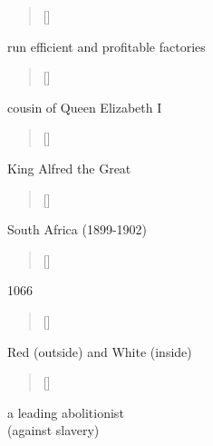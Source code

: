 \documentclass[grid,avery5371]{flashcards}
\begin{document}
\begin{flashcard}[]{%
\begin{verse}[\versewidth]
\end{verse}}

run efficient and profitable factories

\end{flashcard}

\begin{flashcard}[]{%
\begin{verse}[\versewidth]
\end{verse}}

cousin of Queen Elizabeth I

\end{flashcard}

\begin{flashcard}[]{%
\begin{verse}[\versewidth]
\end{verse}}

King Alfred the Great

\end{flashcard}

\begin{flashcard}[]{%
\begin{verse}[\versewidth]
\end{verse}}

South Africa (1899-1902)

\end{flashcard}


\begin{flashcard}[]{%
\begin{verse}[\versewidth]
\end{verse}}

1066

\end{flashcard}

\begin{flashcard}[]{%
\begin{verse}[\versewidth]
\end{verse}}

Red (outside) and White (inside)

\end{flashcard}

\begin{flashcard}[]{%
\begin{verse}[\versewidth]
\end{verse}}

a leading abolitionist \\ (against slavery)

\end{flashcard}
\end{document}
